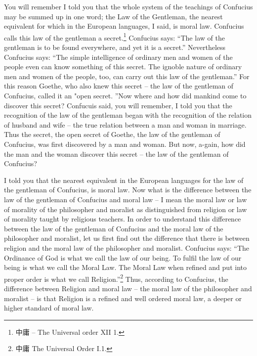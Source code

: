 You will remember I told you that the whole system of the teachings of Confucius may be summed up in one word; the Law of the Gentleman, the nearest equivalent for which in the European languages, I said, is moral law.
Confucius calls this law of the gentleman a secret.\footnote{中庸 -- The Universal order XII 1.} 
Confucius says: ``The law of the gentleman is to be found everywhere, and yet it is a secret.''
Nevertheless Confucius says: ``The simple intelligence of ordinary men and women of the people even can know something of this secret.
The ignoble nature of ordinary men and women of the people, too, can carry out this law of the gentleman.''
For this reason Goethe, who also knew this secret -- the law of the gentleman of Confucius, called it an "open secret.
''Now where and how did mankind come to discover this secret?
Confucuis said, you will remember, I told you that the recognition of the law of the gentleman began with the recognition of the relation of husband and wife -- the true relation between a man and woman in marriage.
Thus the secret, the open secret of Goethe, the law of the gentleman of Confucius, was first discovered by a man and woman.
But now, a-gain, how did the man and the woman discover this secret -- the law of the gentleman of Confucius?

I told you that the nearest equivalent in the European languages for the law of the gentleman of Confucius, is moral law.
Now what is the difference between the law of the gentleman of Confucius and moral law
-- I mean the moral law or law of morality of the philosopher and moralist as distinguished from religion or law of morality taught by religious teachers.
In order to understand this difference between the law of the gentleman of Confucius and the moral law of the philosopher and moralist, let us first find out the difference that there is between religion and the moral law of the philosopher and moralist.
Confucius says: ``The Ordinance of God is what we call the law of our being.
To fulfil the law of our being is what we call the Moral Law.
The Moral Law when refined and put into proper order is what we call Religion.''\footnote{中庸 The Universal Order I.1.}
Thus, according to Confucius, the difference between Religion and moral law
-- the moral law of the philosopher and moralist
-- is that Religion is a refined and well ordered moral law, a deeper or higher standard of moral law.

